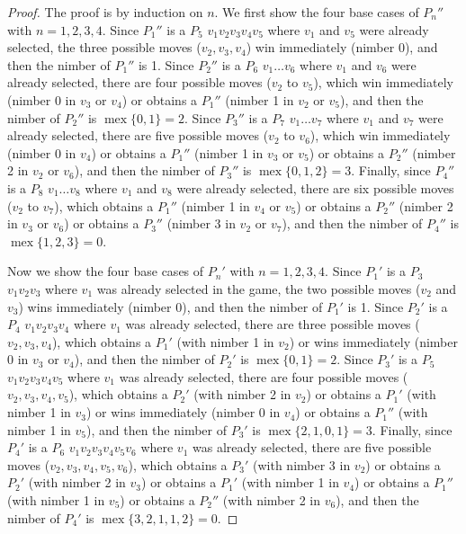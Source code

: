 \documentclass[12pt]{article}
\DeclareMathOperator{\mex}{mex}
\begin{document}
\begin{proof}
The proof is by induction on $n$.
We first show the four base cases of $P_n''$ with $n=1,2,3,4$.
Since $P_1''$ is a $P_5$ $v_1v_2v_3v_4v_5$ where $v_1$ and $v_5$ were already selected, the three possible moves ($v_2,v_3,v_4$) win immediately (nimber $0$), and then the nimber of $P_1''$ is 1.
Since $P_2''$ is a $P_6$ $v_1\ldots v_6$ where $v_1$ and $v_6$ were already selected, there are four possible moves ($v_2$ to $v_5$), which win immediately (nimber $0$ in $v_3$ or $v_4$) or obtains a $P_1''$ (nimber 1 in $v_2$ or $v_5$), and then the nimber of $P_2''$ is $\mex\{0,1\}=2$.
Since $P_3''$ is a $P_7$ $v_1\ldots v_7$ where $v_1$ and $v_7$ were already selected, there are five possible moves ($v_2$ to $v_6$), which win immediately (nimber $0$ in $v_4$) or obtains a $P_1''$ (nimber 1 in $v_3$ or $v_5$) or obtains a $P_2''$ (nimber 2 in $v_2$ or $v_6$), and then the nimber of $P_3''$ is $\mex\{0,1,2\}=3$.
Finally, since $P_4''$ is a $P_8$ $v_1\ldots v_8$ where $v_1$ and $v_8$ were already selected, there are six possible moves ($v_2$ to $v_7$), which obtains a $P_1''$ (nimber 1 in $v_4$ or $v_5$) or obtains a $P_2''$ (nimber 2 in $v_3$ or $v_6$) or obtains a $P_3''$ (nimber 3 in $v_2$ or $v_7$), and then the nimber of $P_4''$ is $\mex\{1,2,3\}=0$.

Now we show the four base cases of $P_n'$ with $n=1,2,3,4$.
Since $P_1'$ is a $P_3$ $v_1v_2v_3$ where $v_1$ was already selected in the game, the two possible moves ($v_2$ and $v_3$) wins immediately (nimber $0$), and then the nimber of $P_1'$ is 1.
Since $P_2'$ is a $P_4$ $v_1v_2v_3v_4$ where $v_1$ was already selected, there are three possible moves ($v_2,v_3,v_4$), which obtains a $P_1'$ (with nimber 1 in $v_2$) or wins immediately (nimber $0$ in $v_3$ or $v_4$), and then the nimber of $P_2'$ is $\mex\{0,1\}=2$.
Since $P_3'$ is a $P_5$ $v_1v_2v_3v_4v_5$ where $v_1$ was already selected, there are four possible moves ($v_2,v_3,v_4,v_5$), which obtains a $P_2'$ (with nimber 2 in $v_2$) or obtains a $P_1'$ (with nimber 1 in $v_3$) or wins immediately (nimber $0$ in $v_4$) or obtains a $P_1''$ (with nimber 1 in $v_5$), and then the nimber of $P_3'$ is $\mex\{2,1,0,1\}=3$.
Finally, since $P_4'$ is a $P_6$ $v_1v_2v_3v_4v_5v_6$ where $v_1$ was already selected, there are five possible moves ($v_2,v_3,v_4,v_5,v_6$), which obtains a $P_3'$ (with nimber 3 in $v_2$) or obtains a $P_2'$ (with nimber 2 in $v_3$) or obtains a $P_1'$ (with nimber 1 in $v_4$) or obtains a $P_1''$ (with nimber 1 in $v_5$) or obtains a $P_2''$ (with nimber 2 in $v_6$), and then the nimber of $P_4'$ is $\mex\{3,2,1,1,2\}=0$.


\end{proof}
\end{document}
